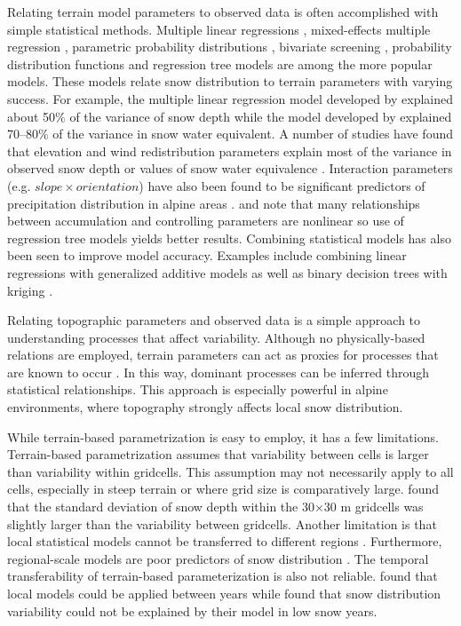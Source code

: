 \documentclass{sfuthesis}
\begin{document}
Relating terrain model parameters to observed data is often accomplished with simple statistical methods. Multiple linear regressions \citep{Marchand2005, Sold2013, McGrath2015}, mixed-effects multiple regression \citep{Kasurak2011}, parametric probability distributions \citep{Clark2011}, bivariate screening \citep{Anderton2004}, probability distribution functions \citep{Kerr2013} and regression tree models \citep{Elder1998, Winstral2002, Molotch2005, Revuelto2014, Wetlaufer2016} are among the more popular models. These models relate snow distribution to terrain parameters with varying success. For example, the multiple linear regression model developed by \cite{Sold2013} explained about 50$\%$ of the variance of snow depth while the model developed by \cite{Anderton2004} explained 70--80$\%$ of the variance in snow water equivalent. A number of studies have found that elevation and wind redistribution parameters explain most of the variance in observed snow depth or values of snow water equivalence \citep[e.g.][]{Erickson2005, Trujillo2009,Schirmer2011, Grunewald2014, McGrath2015}. Interaction parameters (e.g. $slope \times orientation$) have also been found to be significant predictors of precipitation distribution in alpine areas \citep{Basist1994}. \cite{Erxleben2002} and \cite{Molotch2005} note that many relationships between accumulation and controlling parameters are nonlinear so use of regression tree models yields better results. Combining statistical models has also been seen to improve model accuracy. Examples include combining linear regressions with generalized additive models \citep{Lopez2006} as well as binary decision trees with kriging \citep{Balk2000}. 

Relating topographic parameters and observed data is a simple approach to understanding processes that affect variability. Although no physically-based relations are employed, terrain parameters can act as proxies for processes that are known to occur \citep{McGrath2015}. In this way, dominant processes can be inferred through statistical relationships. This approach is especially powerful in alpine environments, where topography strongly affects local snow distribution. 

While terrain-based parametrization is easy to employ, it has a few limitations. Terrain-based parametrization assumes that variability between cells is larger than variability within gridcells. This assumption may not necessarily apply to all cells, especially in steep terrain or where grid size is comparatively large. \cite{Marchand2005} found that the standard deviation of snow depth within the 30$\times$30 m gridcells was slightly larger than the variability between gridcells. Another limitation is that local statistical models cannot be transferred to different regions \citep[e.g.][]{Grunewald2013}. Furthermore, regional-scale models are poor predictors of snow distribution \citep[e.g.][]{Grunewald2013}. The temporal transferability of terrain-based parameterization is also not reliable.  \cite{Grunewald2013} found that local models could be applied between years while \cite{Revuelto2014} found that snow distribution variability could not be explained by their model in low snow years. 
\end{document}
